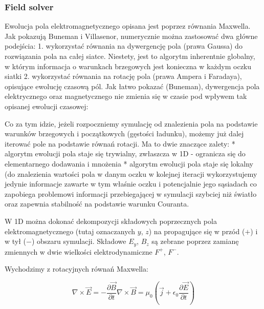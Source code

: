     \subsubsection{Field solver} %

    Ewolucja pola elektromagnetycznego opisana jest poprzez równania Maxwella. Jak pokazują Buneman i Villasenor,
    numerycznie można zastosować dwa główne podejścia: %
    1. wykorzystać równania na dywergencję pola (prawa Gaussa) do rozwiązania pola na całej siatce. Niestety, jest to
    algorytm inherentnie globalny, w którym informacja o warunkach brzegowych jest konieczna w każdym oczku siatki
    2. wykorzystać równania na rotację pola (prawa Ampera i Faradaya), opisujące ewolucję czasową pól. Jak łatwo pokazać (Buneman),
    dywergencja pola elektrycznego oraz magnetycznego nie zmienia się w czasie pod wpływem tak opisanej ewolucji czasowej:

    Co za tym idzie, jeżeli rozpoczniemy symulację od znalezienia pola na podstawie warunków brzegowych i początkowych (gęstości
    ładunku), możemy już dalej iterować pole na podstawie równań rotacji. Ma to dwie znaczące zalety:
    * algorytm ewolucji pola staje się trywialny, zwłaszcza w 1D - ogranicza się do elementarnego dodawania i mnożenia %
    * algorytm ewolucji pola staje się lokalny (do znalezienia wartości pola w danym oczku w kolejnej iteracji wykorzystujemy
    jedynie informacje zawarte w tym właśnie oczku i potencjalnie jego sąsiadach %
    co zapobiega problemowi informacji przebiegającej w symulacji szybciej niż światło oraz zapewnia stabilność na podstawie
    warunku Couranta.

    W 1D można dokonać dekompozycji składowych poprzecznych pola elektromagnetycznego (tutaj oznaczanych $y$, $z$) na
    propagujące się w przód ($+$) i w tył ($-$) obszaru symulacji. Składowe $E_y$, $B_z$ są zebrane poprzez zamianę zmiennych
    w dwie wielkości elektrodynamiczne $F^+$, $F^-$.

    Wychodzimy z rotacyjnych równań Maxwella:

    \begin{equation}
        \nabla \times \vec{E} = -\frac{\partial \vec{B}}{\partial t}
        \nabla \times \vec{B} = \mu_0 (\vec{j} + \epsilon_0 \frac{\partial \vec{E}}{\partial t})
        \label{eqn:Maxwell-rotation-derivation}
    \end{equation}

